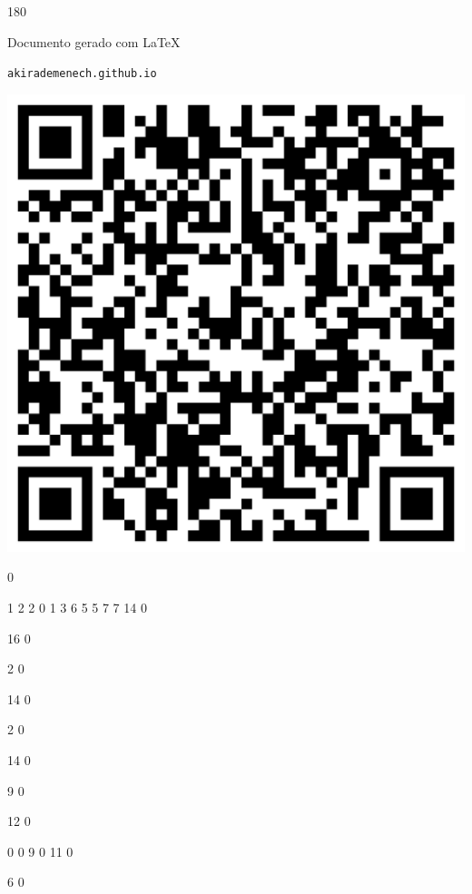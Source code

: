\documentclass[12pt]{article}
\begin{document}
	\begin{turn}{180}	
		\begin{minipage}{\textwidth}		  
		  Documento gerado com \LaTeX			
		  
		  \texttt{akirademenech.github.io}

		  \includegraphics[height=0.3\textheight]{2e-2.pdf}

		\end{minipage}	
	\end{turn}  
		  
		\vfill  
		  
{
	0	%

	1	%
	2	%
	2	%
	0	%
	1	%
	3	%
	6	%
	5	%
	5	%
	7	%
	7	%
	14	%
	0	%

	16	%
	0	%

	2	%
	0	%

	14	%
	0	%

	2	%
	0	%

	14	%
	0	%

	9	%
	0	%

	12	%
	0	%

	0	%
	0	%
	9	%
	0	%
	11	%
	0	%

	6	%
	0	%

}	  
		    	
\end{document}
